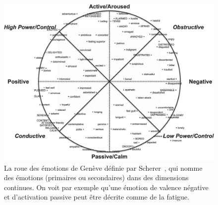 \begin{figure}
  \centering
  \includegraphics[width=14cm]{./Chapitre1/figures/Genova.png}
  \caption{La roue des émotions de Genève définie par Scherer~\cite{Scherer2005}, qui nomme des émotions (primaires ou secondaires) dans des dimensions continues. On voit par exemple qu'une émotion de valence négative et d'activation passive peut être décrite comme de la fatigue.}
  \label{fig:Genova}
\end{figure}
